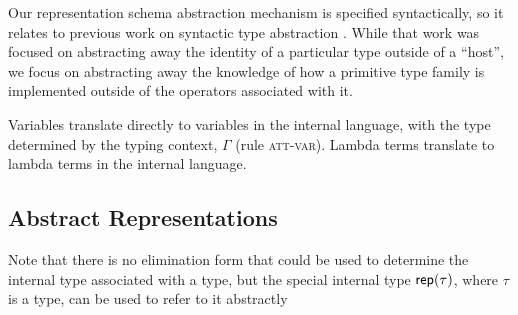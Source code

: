 \documentclass{llncs}
\begin{document}
Our representation schema abstraction mechanism is specified syntactically, so it relates to previous work on syntactic type abstraction \cite{syntypeabs}. While that work was focused on abstracting away the identity of a particular type outside of a ``host'', we focus on abstracting away the knowledge of how a primitive type family is implemented outside of the operators associated with it.

Variables translate directly to variables in the internal language, with the type determined by the typing context, $\Gamma$ (rule \textsc{att-var}). Lambda terms translate to lambda terms in the internal language.  

\subsection{Abstract Representations}
Note that there is no elimination form that could be used to determine the internal type associated with a type, but the special internal type ${\sf rep}(\tau)$, where $\tau$ is a type, can be used to refer to it abstractly
\end{document}

